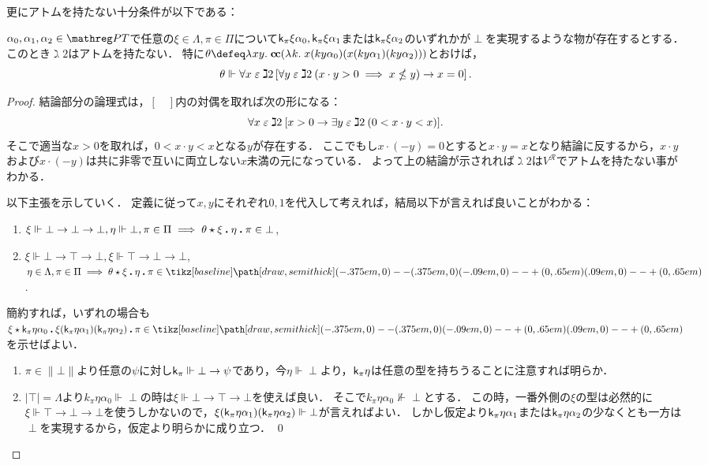 \documentclass[realisability.tex]{subfiles}
\begin{document}
更にアトムを持たない十分条件が以下である：

\begin{lemma}\label{lem:gimel2-atomless}
 $\alpha_0, \alpha_1, \alpha_2 \in \PT$で任意の$\xi \in \Lambda, \pi \in \Pi$について$\mathsf{k}_\pi \xi \alpha_0, \mathsf{k}_\pi \xi \alpha_1$または$\mathsf{k}_\pi \xi \alpha_2$のいずれかが$\perp$を実現するような物が存在するとする．
 このとき$\gimel2$はアトムを持たない．
 特に$\theta \defeq \abs{xy}{\cc (\abs{k}{x (k y \alpha_0)(x (k y \alpha_1)(k y \alpha_2))})}$とおけば，
 \[
  \theta \Vdash \forall x \mathrel{\varepsilon} \gimel 2 \left[ \forall y \mathrel{\varepsilon} \gimel 2 \: (x \cdot y > 0 \implies x \nleq y) \to x = 0 \right].
 \]
\end{lemma}
\begin{proof}
 結論部分の論理式は，$[\quad]$内の対偶を取れば次の形になる：
 \[
  \forall x \mathrel{\varepsilon} \gimel 2 \: [ x > 0 \to \exists y \mathrel{\varepsilon} \gimel 2 \: (0 < x \cdot y < x)].
 \]
 そこで適当な$x > 0$を取れば，$0 < x \cdot y < x$となる$y$が存在する．
 ここでもし$x \cdot (- y) = 0$とすると$x \cdot y = x$となり結論に反するから，$x \cdot y$および$x \cdot (- y)$は共に非零で互いに両立しない$x$未満の元になっている．
 よって上の結論が示されれば$\gimel 2$は$V^{\mathcal{R}}$でアトムを持たない事がわかる．

 以下主張を示していく．
 定義に従って$x, y$にそれぞれ$0, 1$を代入して考えれば，結局以下が言えれば良いことがわかる：
 \begin{enumerate}
  \item $\xi \Vdash \bot \to \bot \to \bot, \eta \Vdash \bot, \pi \in \Pi \implies \KVM{\theta \xi \eta \pi} \in \bot$,
  \item $\xi \Vdash \bot \to \top \to \bot, \xi \Vdash \top \to \bot \to \bot$, $\eta \in \Lambda, \pi \in \Pi \implies \KVM{\theta \xi \eta \pi} \in \pole$.
 \end{enumerate}
 簡約すれば，いずれの場合も$\KVM{\xi {{\conti_\pi \eta \alpha_0}}{\xi (\conti_\pi \eta \alpha_1)(\conti_\pi \eta \alpha_2)} \pi} \in \pole$を示せばよい．
 \begin{enumerate}
  \item $\pi \in \|\bot\|$より任意の$\psi$に対し$\mathsf{k}_\pi \Vdash \bot \to \psi$であり，今$\eta \Vdash \perp$より，$\mathsf{k}_\pi \eta$は任意の型を持ちうることに注意すれば明らか．
  \item $|\top| = \Lambda$より$k_\pi \eta \alpha_0 \Vdash \perp$の時は$\xi \Vdash \bot \to \top \to \bot$を使えば良い．
        そこで$k_\pi \eta \alpha_0 \nVdash \perp$とする．
        この時，一番外側の$\xi$の型は必然的に$\xi \Vdash \top \to \bot \to \bot$を使うしかないので，$\xi (\mathsf{k}_\pi \eta \alpha_1) (\mathsf{k}_\pi \eta \alpha_2) \Vdash \bot$が言えればよい．
        しかし仮定より$\mathsf{k}_\pi \eta \alpha_1$または$\mathsf{k}_\pi \eta \alpha_2$の少なくとも一方は$\perp$を実現するから，仮定より明らかに成り立つ． \qed
 \end{enumerate}
\end{proof}
\end{document}
